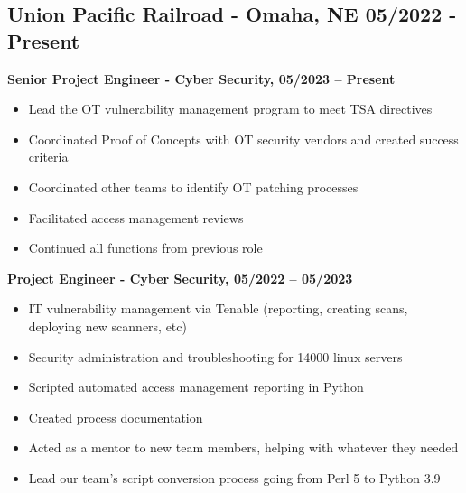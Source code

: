 \documentclass[a4paper,10pt]{article}
\begin{document}
\subsection*{Union Pacific Railroad - Omaha, NE \hfill 05/2022 - Present}
\textbf{Senior Project Engineer - Cyber Security, 05/2023 – Present}
\begin{itemize}
    \item Lead the OT vulnerability management program to meet TSA directives
    \item Coordinated Proof of Concepts with OT security vendors and created success criteria
    \item Coordinated other teams to identify OT patching processes
    \item Facilitated access management reviews
    \item Continued all functions from previous role
\end{itemize}
\textbf{Project Engineer - Cyber Security, 05/2022 – 05/2023}
\begin{itemize}
    \item IT vulnerability management via Tenable (reporting, creating scans, deploying new scanners, etc)
    \item Security administration and troubleshooting for 14000 linux servers
    \item Scripted automated access management reporting in Python
    \item Created process documentation
    \item Acted as a mentor to new team members, helping with whatever they needed
    \item Lead our team's script conversion process going from Perl 5 to Python 3.9
\end{itemize}
\end{document}
